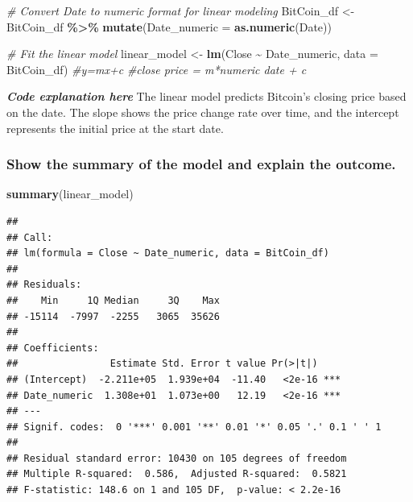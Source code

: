 \documentclass[
]{book}
\newenvironment{Shaded}{\begin{snugshade}}{\end{snugshade}}
\newcommand{\AttributeTok}[1]{\textcolor[rgb]{0.13,0.29,0.53}{#1}}
\newcommand{\CommentTok}[1]{\textcolor[rgb]{0.56,0.35,0.01}{\textit{#1}}}
\newcommand{\FunctionTok}[1]{\textcolor[rgb]{0.13,0.29,0.53}{\textbf{#1}}}
\newcommand{\NormalTok}[1]{#1}
\newcommand{\OtherTok}[1]{\textcolor[rgb]{0.56,0.35,0.01}{#1}}
\newcommand{\SpecialCharTok}[1]{\textcolor[rgb]{0.81,0.36,0.00}{\textbf{#1}}}
\begin{document}
\begin{Shaded}
\begin{Highlighting}[]
\CommentTok{\# Convert Date to numeric format for linear modeling}
\NormalTok{BitCoin\_df }\OtherTok{\textless{}{-}}\NormalTok{ BitCoin\_df }\SpecialCharTok{\%\textgreater{}\%}
\FunctionTok{mutate}\NormalTok{(}\AttributeTok{Date\_numeric =} \FunctionTok{as.numeric}\NormalTok{(Date))}

\CommentTok{\# Fit the linear model}
\NormalTok{linear\_model }\OtherTok{\textless{}{-}} \FunctionTok{lm}\NormalTok{(Close }\SpecialCharTok{\textasciitilde{}}\NormalTok{ Date\_numeric, }\AttributeTok{data =}\NormalTok{ BitCoin\_df)}
\CommentTok{\#y=mx+c}
\CommentTok{\#close price = m*numeric date + c}
\end{Highlighting}
\end{Shaded}

\emph{\textbf{Code explanation here}}
The linear model predicts Bitcoin's closing price based on the date. The slope shows the price change rate over time, and the intercept represents the initial price at the start date.

\subsubsection{Show the summary of the model and explain the outcome.}\label{show-the-summary-of-the-model-and-explain-the-outcome.}

\begin{Shaded}
\begin{Highlighting}[]
\FunctionTok{summary}\NormalTok{(linear\_model)}
\end{Highlighting}
\end{Shaded}

\begin{verbatim}
## 
## Call:
## lm(formula = Close ~ Date_numeric, data = BitCoin_df)
## 
## Residuals:
##    Min     1Q Median     3Q    Max 
## -15114  -7997  -2255   3065  35626 
## 
## Coefficients:
##                Estimate Std. Error t value Pr(>|t|)    
## (Intercept)  -2.211e+05  1.939e+04  -11.40   <2e-16 ***
## Date_numeric  1.308e+01  1.073e+00   12.19   <2e-16 ***
## ---
## Signif. codes:  0 '***' 0.001 '**' 0.01 '*' 0.05 '.' 0.1 ' ' 1
## 
## Residual standard error: 10430 on 105 degrees of freedom
## Multiple R-squared:  0.586,  Adjusted R-squared:  0.5821 
## F-statistic: 148.6 on 1 and 105 DF,  p-value: < 2.2e-16
\end{verbatim}
\end{document}
